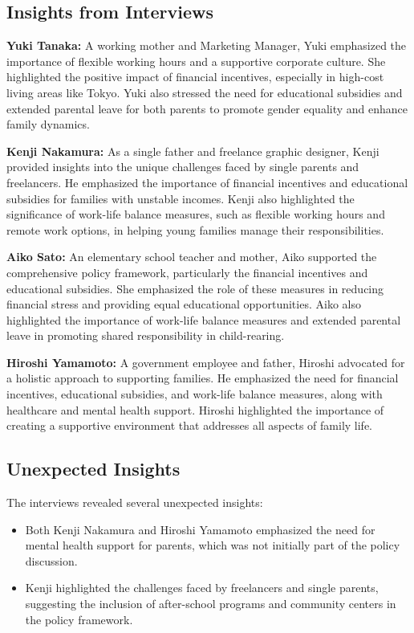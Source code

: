 \documentclass{article} %
\begin{document}
\subsection{Insights from Interviews}
\textbf{Yuki Tanaka:} A working mother and Marketing Manager, Yuki emphasized the importance of flexible working hours and a supportive corporate culture. She highlighted the positive impact of financial incentives, especially in high-cost living areas like Tokyo. Yuki also stressed the need for educational subsidies and extended parental leave for both parents to promote gender equality and enhance family dynamics.

\textbf{Kenji Nakamura:} As a single father and freelance graphic designer, Kenji provided insights into the unique challenges faced by single parents and freelancers. He emphasized the importance of financial incentives and educational subsidies for families with unstable incomes. Kenji also highlighted the significance of work-life balance measures, such as flexible working hours and remote work options, in helping young families manage their responsibilities.

\textbf{Aiko Sato:} An elementary school teacher and mother, Aiko supported the comprehensive policy framework, particularly the financial incentives and educational subsidies. She emphasized the role of these measures in reducing financial stress and providing equal educational opportunities. Aiko also highlighted the importance of work-life balance measures and extended parental leave in promoting shared responsibility in child-rearing.

\textbf{Hiroshi Yamamoto:} A government employee and father, Hiroshi advocated for a holistic approach to supporting families. He emphasized the need for financial incentives, educational subsidies, and work-life balance measures, along with healthcare and mental health support. Hiroshi highlighted the importance of creating a supportive environment that addresses all aspects of family life.

\subsection{Unexpected Insights}
The interviews revealed several unexpected insights:
\begin{itemize}
    \item Both Kenji Nakamura and Hiroshi Yamamoto emphasized the need for mental health support for parents, which was not initially part of the policy discussion.
    \item Kenji highlighted the challenges faced by freelancers and single parents, suggesting the inclusion of after-school programs and community centers in the policy framework.
\end{itemize}
\end{document}
